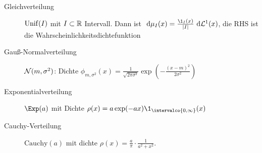 \documentclass[language=ngerman]{../../Template/TemplateLecture}
\begin{document}
\begin{enumerate}[$(1)$]
\begin{description}
        \item[Gleichverteilung] $\operatorname{Unif}(I)$ mit $I \subset \mathbb{R}$ Intervall. Dann ist $\dd\mu_I(x) = \frac{\1_I(x)}{\abs{I}}\dd \cL^1(x)$, die RHS ist die Wahrscheinlichkeitsdichtefunktion
        \item[Gauß-Normalverteilung] $\mathcal{N}(m,\sigma^2)$: Dichte $\phi_{m,\sigma^2}(x) = \frac{1}{\sqrt{2\pi\sigma^2}}\exp\left( -\frac{(x-m)^2}{2\sigma^2} \right)$
        \item[Exponentialverteilung] $\Exp(a)$ mit Dichte $\rho(x) = a\exp(-ax)\1_{\intervalco{0,\infty}}(x)$
        \item[Cauchy-Verteilung] $\mathrm{Cauchy}(a)$ mit dichte $\rho(x) = \frac{a}{\pi} \cdot \frac{1}{a^2+x^2}$.
    \end{description}
\end{enumerate}


\end{document}
